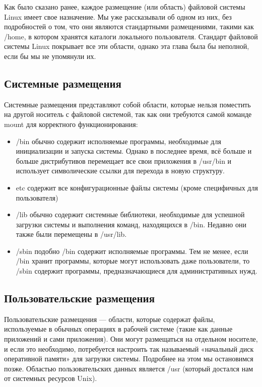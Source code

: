 \documentclass[10pt]{book}
\begin{document}
Как было сказано ранее, каждое размещение (или область) файловой системы Linux имеет свое назначение. Мы уже рассказывали об одном из них, без подробностей о том, что они являются стандартными размещениями, такими как /home, в котором хранятся каталоги локального пользователя. Стандарт файловой системы Linux покрывает все эти области, однако эта глава была бы неполной, если бы мы не упомянули их.

\subsection{Системные размещения}

Системные размещения представляют собой области, которые нельзя поместить на другой носитель с файловой системой, так как они требуются самой команде mount для корректного функционирования:

\begin{itemize}
  \item /bin обычно содержит исполняемые программы, необходимые для инициализации и запуска системы. Однако в последнее время, всё больше и больше дистрибутивов перемещает все свои приложения в /usr/bin и использует символические ссылки для перехода в новую структуру.
  \item etc содержит все конфигурационные файлы системы (кроме специфичных для пользователя)
  \item /lib обычно содержит системные библиотеки, необходимые для успешной загрузки системы и выполнения команд, находящихся в /bin. Недавно они также были перемещены в /usr/lib.
  \item /sbin подобно /bin содержит исполняемые программы. Тем не менее, если /bin хранит программы, которые могут использовать даже пользователи, то /sbin содержит программы, предназначающиеся для административных нужд.
\end{itemize}

\subsection{Пользовательские размещения}

Пользовательские размещения — области, которые содержат файлы, используемые в обычных операциях в рабочей системе (такие как данные приложений и сами приложения). Они могут размещаться на отдельном носителе, и если это необходимо, потребуется настроить так называемый «начальный диск оперативной памяти» для загрузки системы. Подробнее на этом мы остановимся позже. Областью пользовательских данных является /usr (который достался нам от системных ресурсов Unix).
\end{document}
